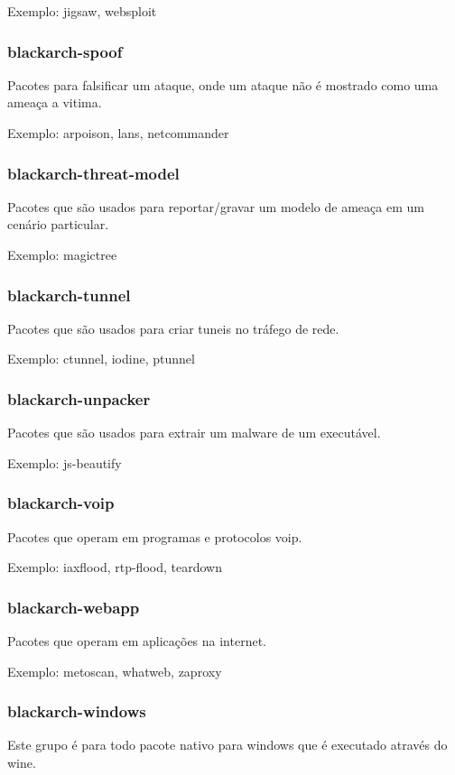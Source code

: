 \documentclass[a4paper, oneside, 11pt]{book}
\begin{document}
Exemplo: jigsaw, websploit

\subsubsection{blackarch-spoof}
Pacotes para falsificar um ataque, onde um ataque não é mostrado como uma ameaça a vitima.

Exemplo: arpoison, lans, netcommander

\subsubsection{blackarch-threat-model}
Pacotes que são usados para reportar/gravar um modelo de ameaça em um cenário particular.

Exemplo: magictree

\subsubsection{blackarch-tunnel}
Pacotes que são usados para criar tuneis no tráfego de rede.

Exemplo: ctunnel, iodine, ptunnel

\subsubsection{blackarch-unpacker}
Pacotes que são usados para extrair um malware de um executável.

Exemplo: js-beautify

\subsubsection{blackarch-voip}
Pacotes que operam em programas e protocolos voip.

Exemplo: iaxflood, rtp-flood, teardown

\subsubsection{blackarch-webapp}
Pacotes que operam em aplicações na internet.

Exemplo: metoscan, whatweb, zaproxy

\subsubsection{blackarch-windows}
Este grupo é para todo pacote nativo para windows que é executado através do wine.
\end{document}
